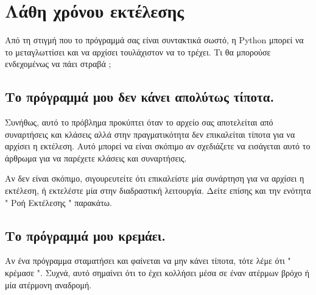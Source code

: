 \documentclass[10pt]{book}
\begin{document}
\section{Λάθη χρόνου εκτέλεσης}

Από τη στιγμή που το πρόγραμμά σας είναι συντακτικά σωστό, η  Python  μπορεί να το 
μεταγλωττίσει και να αρχίσει τουλάχιστον να το τρέχει. Τι θα μπορούσε ενδεχομένως να πάει στραβά ;  


\subsection{Το πρόγραμμά μου δεν κάνει απολύτως τίποτα.}

Συνήθως, αυτό το πρόβλημα προκύπτει όταν το αρχείο σας αποτελείται από συναρτήσεις και 
κλάσεις αλλά στην πραγματικότητα δεν επικαλείται τίποτα για να αρχίσει η εκτέλεση.  
Αυτό μπορεί να είναι σκόπιμο αν σχεδιάζετε να εισάγεται αυτό το άρθρωμα για να παρέχετε 
κλάσεις και συναρτήσεις.

Αν δεν είναι σκόπιμο, σιγουρευτείτε ότι επικαλείστε μία συνάρτηση για να αρχίσει η εκτέλεση, 
ή εκτελέστε μία στην διαδραστική λειτουργία.  Δείτε επίσης και την ενότητα  " 
Ροή Εκτέλεσης "  παρακάτω.


\subsection{Το πρόγραμμά μου κρεμάει.}

Αν ένα πρόγραμμα σταματήσει και φαίνεται να μην κάνει τίποτα, τότε λέμε ότι  " κρέμασε ".   Συχνά, αυτό σημαίνει ότι το έχει κολλήσει μέσα σε έναν ατέρμων βρόχο ή μία ατέρμονη αναδρομή. 
\end{document}
